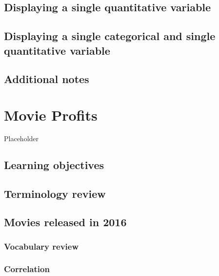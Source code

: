 \documentclass[
]{report}
\begin{document}
\hypertarget{displaying-a-single-quantitative-variable}{%
\section{Displaying a single quantitative variable}\label{displaying-a-single-quantitative-variable}}

\hypertarget{displaying-a-single-categorical-and-single-quantitative-variable}{%
\section{Displaying a single categorical and single quantitative variable}\label{displaying-a-single-categorical-and-single-quantitative-variable}}

\hypertarget{additional-notes}{%
\section{Additional notes}\label{additional-notes}}

\hypertarget{movie-profits}{%
\chapter{Movie Profits}\label{movie-profits}}

Placeholder

\hypertarget{learning-objectives}{%
\section{Learning objectives}\label{learning-objectives}}

\hypertarget{terminology-review}{%
\section{Terminology review}\label{terminology-review}}

\hypertarget{movies-released-in-2016}{%
\section{Movies released in 2016}\label{movies-released-in-2016}}

\hypertarget{vocabulary-review}{%
\subsection{Vocabulary review}\label{vocabulary-review}}

\hypertarget{correlation}{%
\subsection{Correlation}\label{correlation}}
\end{document}
